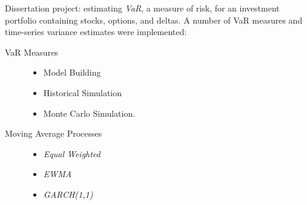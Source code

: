 \documentclass[letterpaper,11pt]{article}
\begin{document}
\begin{description}[style=multiline,leftmargin=3cm]
	\item[Value at Risk \textnormal{\tiny
		      \href{https://adrian.ng/java/var/}{adrian.ng/java/var/}}]
	      Dissertation project: estimating \textit{VaR}, a measure of risk, for an investment portfolio containing stocks, options, and deltas. A number of VaR measures and time-series variance estimates were implemented:
	      \begin{multicols}{2}
		      \begin{description}
			      \item[VaR Measures]
			            \hfill
			            \begin{itemize}
				            \item Model Building
				            \item Historical Simulation
				            \item Monte Carlo Simulation.
			            \end{itemize}
			            \columnbreak
			      \item[Moving Average Processes]
			            \hfill
			            \begin{itemize}
				            \item \textit{Equal Weighted}
				            \item \textit{EWMA}
				            \item \textit{GARCH(1,1)}
			            \end{itemize}
		      \end{description}
	      \end{multicols}


\end{description}
\end{document}
